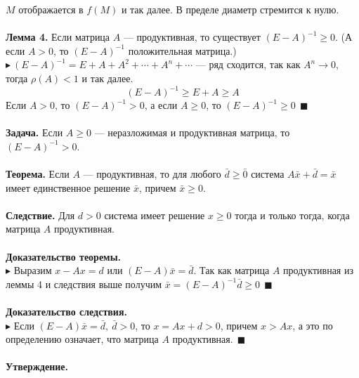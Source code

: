 \documentclass[12pt]{article}
\theoremstyle{definition}
\numberwithin{equation}{section}
\begin{document}
	$M$ отображается в $f(M)$ и так далее. В пределе диаметр стремится к нулю.\\
	\\
	\textbf{Лемма 4.} Если матрица $A$ --- продуктивная, то существует $(E-A)^{-1}\geqslant 0$. (А если $A>0$, то $(E-A)^{-1}$ положительная матрица.)\\
	$\blacktriangleright~(E-A)^{-1}=E+A+A^2+\cdots +A^n+\cdots$ --- ряд сходится, так как $A^n \to 0$, тогда $\rho(A)<1$ и так далее.\\
	$$(E-A)^{-1}\geqslant E+A \geqslant A$$
	Если $A>0$, то $(E-A)^{-1}>0$, а если $A\geqslant 0$, то $(E-A)^{-1}\geqslant 0~~\blacksquare$\\
	\\
	\textbf{Задача.} Если $A\geqslant 0$ --- неразложимая и продуктивная матрица, то $(E-A)^{-1}>0$.\\
	\\
	\textbf{Теорема.} Если $A$ --- продуктивная, то для любого $\bar d \geqslant \bar 0$ система $A\bar x+\bar d=\bar x$ имеет единственное решение $\bar x$, причем $\bar x \geqslant 0$.\\
	\\
	\textbf{Следствие.} Для $d>0$ система имеет решение $x \geqslant 0$ тогда и только тогда, когда матрица $A$ продуктивная.\\
	\\
	\textbf{Доказательство теоремы.}\\
	$\blacktriangleright$ Выразим $x-Ax=d$ или $(E-A)\bar x=\bar d$. Так как матрица $A$ продуктивная из леммы 4 и следствия выше получим $\bar x=(E-A)^{-1}\bar d\geqslant 0~~\blacksquare$\\
	\\
	\textbf{Доказательство следствия.}\\
	$\blacktriangleright$ Если $(E-A)\bar x=\bar d,~\bar d>0$, то $x=Ax+d>0$, причем $x>Ax$, а это по определению означает, что матрица $A$ продуктивная.$~~\blacksquare$\\
	\\
	\textbf{Утверждение.}
\end{document}
